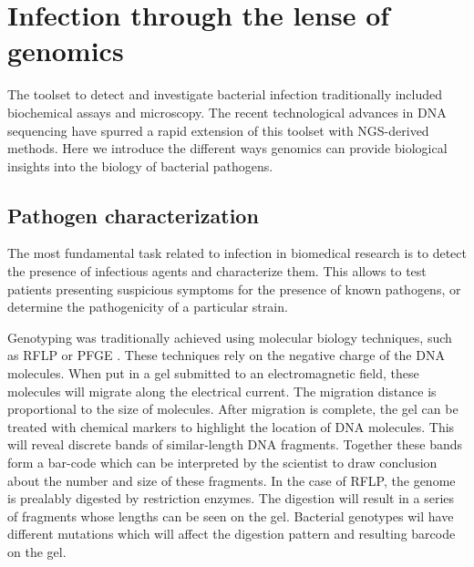 
\chapter{Infection through the lense of genomics} %

\label{ch:01-02} %


The toolset to detect and investigate bacterial infection traditionally included biochemical assays and microscopy. The recent technological advances in DNA sequencing have spurred a rapid extension of this toolset with NGS-derived methods. Here we introduce the different ways genomics can provide biological insights into the biology of bacterial pathogens.

\section{Pathogen characterization}

The most fundamental task related to infection in biomedical research is to detect the presence of infectious agents and characterize them. This allows to test patients presenting suspicious symptoms for the presence of known pathogens, or determine the pathogenicity of a particular strain. 

Genotyping was traditionally achieved using molecular biology techniques, such as \acrfull{RFLP} or \acrfull{PFGE} \cite{OchoaDiaz2018}. These techniques rely on the negative charge of the DNA molecules. When put in a gel submitted to an electromagnetic field, these molecules will migrate along the electrical current. The migration distance is proportional to the size of molecules. After migration is complete, the gel can be treated with chemical markers to highlight the location of DNA molecules. This will reveal discrete bands of similar-length DNA fragments. Together these bands form a bar-code which can be interpreted by the scientist to draw conclusion about the number and size of these fragments. In the case of \acrshort{RFLP}, the genome is prealably digested by \Gls{restriction enzyme}s. The digestion will result in a series of fragments whose lengths can be seen on the gel. Bacterial genotypes wil have different mutations which will affect the digestion pattern and resulting barcode on the gel.

